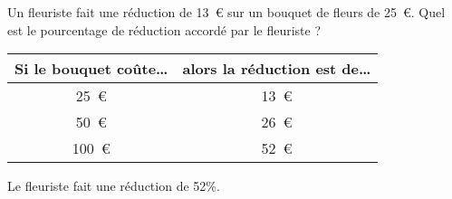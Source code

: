 Un fleuriste fait une réduction de 13~\textgreek{\euro} sur un bouquet de fleurs de 25~\textgreek{\euro}. Quel est le pourcentage de réduction accordé par le fleuriste ?
\begin{center}
  \begin{tabular}{c|c}
    Si le bouquet coûte\ldots&alors la réduction est de\ldots\\
\hline
25~\textgreek{\euro}&13~\textgreek{\euro}\\
50~\textgreek{\euro}&26~\textgreek{\euro}\\
100~\textgreek{\euro}&52~\textgreek{\euro}\\
  \end{tabular}
\end{center}
Le fleuriste fait une réduction de 52\%.